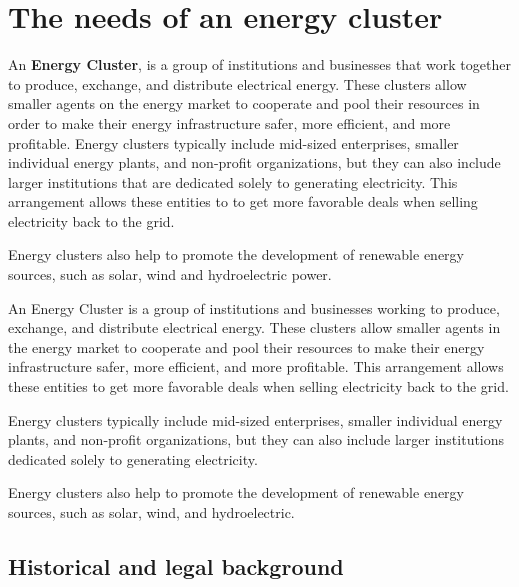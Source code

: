 \chapter{The needs of an energy cluster}
\label{ch:background}

\par An \textbf{Energy Cluster}, is a group of institutions and businesses that work together to produce, exchange, and distribute electrical energy. These clusters allow smaller agents on the energy market to cooperate and pool their resources in order to make their energy infrastructure safer, more efficient, and more profitable. Energy clusters typically include mid-sized enterprises, smaller individual energy plants, and non-profit organizations, but they can also include larger institutions that are dedicated solely to generating electricity. This arrangement allows these entities to to get more favorable deals when selling electricity back to the grid. 
\par Energy clusters also help to promote the development of renewable energy sources, such as solar, wind and hydroelectric power\citep{Uwarunkowania1}\citep{Uwarunkowania2}\citep{WoznyMasters}.
\par An Energy Cluster is a group of institutions and businesses working to produce, exchange, and distribute electrical energy. These clusters allow smaller agents in the energy market to cooperate and pool their resources to make their energy infrastructure safer, more efficient, and more profitable. This arrangement allows these entities to get more favorable deals when selling electricity back to the grid. 
\par Energy clusters typically include mid-sized enterprises, smaller individual energy plants, and non-profit organizations, but they can also include larger institutions dedicated solely to generating electricity. 
\par Energy clusters also help to promote the development of renewable energy sources, such as solar, wind, and hydroelectric.

\section{Historical and legal background}

